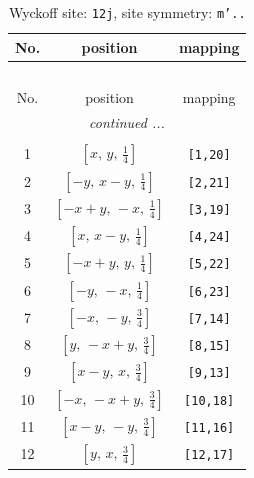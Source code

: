 \documentclass[fleqn,8pt]{jsarticle}
\begin{document}
\begin{longtable}{ccc}
\caption{Wyckoff site: {\tt 12j}, site symmetry: {\tt m'..}}
 \\
 \hline \hline
No. & position & mapping \\ \hline \endfirsthead

\multicolumn{2}{l}{\tablename\ \thetable{}} \\
 \hline \hline
No. & position & mapping \\ \hline \endhead

 \hline \hline
\multicolumn{2}{r}{\footnotesize\it continued ...} \\ \endfoot

 \hline \hline
\multicolumn{2}{r}{} \\ \endlastfoot

1 & $\left[ x,\, y,\, \frac{1}{4} \right]$ & {\tt [1,20]} \\ \hline
2 & $\left[ - y,\, x - y,\, \frac{1}{4} \right]$ & {\tt [2,21]} \\ \hline
3 & $\left[ - x + y,\, - x,\, \frac{1}{4} \right]$ & {\tt [3,19]} \\ \hline
4 & $\left[ x,\, x - y,\, \frac{1}{4} \right]$ & {\tt [4,24]} \\ \hline
5 & $\left[ - x + y,\, y,\, \frac{1}{4} \right]$ & {\tt [5,22]} \\ \hline
6 & $\left[ - y,\, - x,\, \frac{1}{4} \right]$ & {\tt [6,23]} \\ \hline
7 & $\left[ - x,\, - y,\, \frac{3}{4} \right]$ & {\tt [7,14]} \\ \hline
8 & $\left[ y,\, - x + y,\, \frac{3}{4} \right]$ & {\tt [8,15]} \\ \hline
9 & $\left[ x - y,\, x,\, \frac{3}{4} \right]$ & {\tt [9,13]} \\ \hline
10 & $\left[ - x,\, - x + y,\, \frac{3}{4} \right]$ & {\tt [10,18]} \\ \hline
11 & $\left[ x - y,\, - y,\, \frac{3}{4} \right]$ & {\tt [11,16]} \\ \hline
12 & $\left[ y,\, x,\, \frac{3}{4} \right]$ & {\tt [12,17]} \\
\end{longtable}
\renewcommand{\arraystretch}{1.2}
\end{document}

